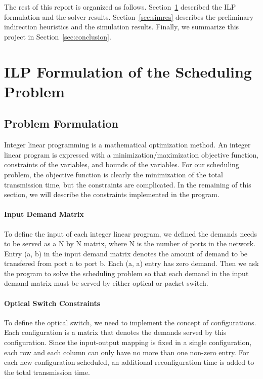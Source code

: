 The rest of this report is organized as follows. Section~\ref{sec:ilp}
described the ILP formulation and the solver results.
Section~\ref{sec:simres} describes the preliminary indirection
heuristics and the simulation results. Finally, we summarize this
project in Section~\ref{sec:conclusion}.

\section{ILP Formulation of the Scheduling Problem}
\label{sec:ilp}

\subsection{Problem Formulation}
Integer linear programming is a mathematical optimization method. An
integer linear program is expressed with a minimization/maximization
objective function, constraints of the variables, and bounds of the
variables. For our scheduling problem, the objective function is clearly
the minimization of the total transmission time, but the constraints are
complicated. In the remaining of this section, we will describe the
constraints implemented in the program.

\paragraph{Input Demand Matrix}
To define the input of each integer linear program, we defined the demands
needs to be served as a N by N matrix, where N is the number of ports in the
network. Entry (a, b) in the input demand matrix denotes the amount of demand
to be transfered from port a to port b. Each (a, a) entry has zero demand.
Then we ask the program to solve the scheduling problem so that each demand in
the input demand matrix must be served by either optical or packet switch.

\paragraph{Optical Switch Constraints}
To define the optical switch, we need to implement the concept of configurations.
Each configuration is a matrix that denotes the demands served by this
configuration. Since the input-output mapping is fixed in a single configuration,
each row and each column can only have no more than one non-zero entry.
For each new configuration scheduled, an additional reconfiguration time
is added to the total transmission time. 


